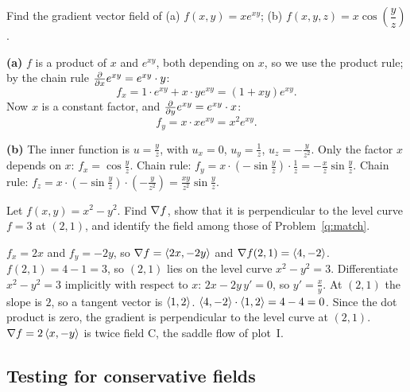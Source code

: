 \begin{problem}\label{q:grad1}
Find the gradient vector field of (a) $f(x,y)=xe^{xy}$;
(b) $f(x,y,z)=x\cos\left(\dfrac yz\right)$.
\end{problem}
\begin{solution}
\textbf{(a)}
 $f$ is a product of $x$ and $e^{xy}$, both depending on $x$, so we use the
product rule; by the chain rule $\frac{\partial }{\partial x}e^{xy}=e^{xy}\cdot y$:
\[
  f_x=1\cdot e^{xy}+x\cdot ye^{xy}=(1+xy)e^{xy}.
\]
 Now $x$ is a constant factor, and $\frac{\partial }{\partial y}e^{xy}=e^{xy}\cdot x$:
\[
  f_y=x\cdot xe^{xy}=x^2e^{xy}.
\]

\textbf{(b)} The inner function is $u=\frac yz$, with $u_x=0$, $u_y=\frac1z$, $u_z=-\frac{y}{z^2}$.
 Only the factor $x$ depends on $x$: $f_x=\cos\frac yz$.
 Chain rule: $f_y=x\cdot\left(-\sin\frac yz\right)\cdot\frac1z=-\frac xz\sin\frac yz$.
 Chain rule: $f_z=x\cdot\left(-\sin\frac yz\right)\cdot\left(-\frac{y}{z^2}\right)=\frac{xy}{z^2}\sin\frac yz$.
\end{solution}

\begin{problem}\label{q:grad2}
Let $f(x,y)=x^2-y^2$. Find $\nabla f$, show that it is perpendicular to the level
curve $f=3$ at $(2,1)$, and identify the field among those of
Problem~\ref{q:match}.
\end{problem}
\begin{solution}
 $f_x=2x$ and $f_y=-2y$, so $\nabla f=\left\langle 2x,-2y \right\rangle$ and $\nabla f(2,1)=\left\langle 4,-2 \right\rangle$.
 $f(2,1)=4-1=3$, so $(2,1)$ lies on the level curve $x^2-y^2=3$.
 Differentiate $x^2-y^2=3$ implicitly with
respect to $x$: $2x-2y\,y'=0$, so $y'=\frac xy$. At $(2,1)$ the slope is $2$, so a tangent
vector is $\left\langle 1,2 \right\rangle$.
 $\left\langle 4,-2 \right\rangle\cdot\left\langle 1,2 \right\rangle=4-4=0$. Since the dot product is zero, the
gradient is perpendicular to the level curve at $(2,1)$.\checkok
{} $\nabla f=2\left\langle x,-y \right\rangle$ is twice field C, the saddle flow of plot~I.
\end{solution}

\subsection{Testing for conservative fields}

